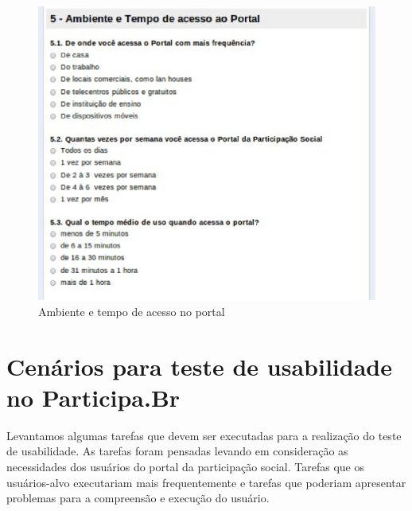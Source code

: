 \begin{figure}[!h]
    \centering
    \includegraphics[keepaspectratio=true,scale=0.60]
      {figuras/perf6.eps}
    \caption{Ambiente e tempo de acesso no portal}
    \label{acessoportal}
\end{figure}

\section{Cenários para teste de usabilidade no Participa.Br}

Levantamos algumas tarefas que devem ser executadas para a realização do teste de usabilidade. As tarefas foram pensadas levando em consideração as necessidades dos usuários do portal da participação social. Tarefas que os usuários-alvo executariam mais frequentemente e tarefas que poderiam apresentar problemas para a compreensão e execução do usuário. 

